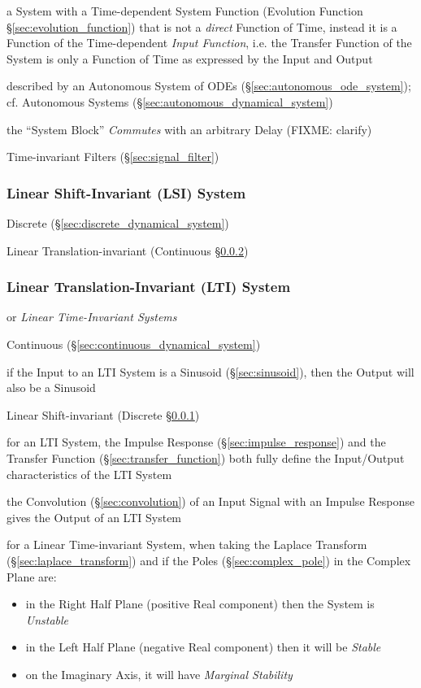 a System with a Time-dependent System Function (Evolution Function
\S\ref{sec:evolution_function}) that is not a \emph{direct} Function of Time,
instead it is a Function of the Time-dependent \emph{Input Function}, i.e. the
Transfer Function of the System is only a Function of Time as expressed by the
Input and Output

described by an Autonomous System of ODEs (\S\ref{sec:autonomous_ode_system});
cf. Autonomous Systems (\S\ref{sec:autonomous_dynamical_system})

the ``System Block'' \emph{Commutes} with an arbitrary Delay (FIXME: clarify)

\fist Time-invariant Filters (\S\ref{sec:signal_filter})



\subsubsection{Linear Shift-Invariant (LSI) System}\label{sec:lsi_system}

Discrete (\S\ref{sec:discrete_dynamical_system})

\fist Linear Translation-invariant (Continuous \S\ref{sec:lti_system})



\subsubsection{Linear Translation-Invariant (LTI) System}
\label{sec:lti_system}

or \emph{Linear Time-Invariant Systems}

Continuous (\S\ref{sec:continuous_dynamical_system})

if the Input to an LTI System is a Sinusoid (\S\ref{sec:sinusoid}), then the
Output will also be a Sinusoid

\fist Linear Shift-invariant (Discrete \S\ref{sec:lsi_system})

for an LTI System, the Impulse Response (\S\ref{sec:impulse_response}) and the
Transfer Function (\S\ref{sec:transfer_function}) both fully define the
Input/Output characteristics of the LTI System

the Convolution (\S\ref{sec:convolution}) of an Input Signal with an Impulse
Response gives the Output of an LTI System

for a Linear Time-invariant System, when taking the Laplace Transform
(\S\ref{sec:laplace_transform}) and if the Poles (\S\ref{sec:complex_pole}) in
the Complex Plane are:
\begin{itemize}
  \item in the Right Half Plane (positive Real component) then the System is
    \emph{Unstable}
  \item in the Left Half Plane (negative Real component) then it will be
    \emph{Stable}
  \item on the Imaginary Axis, it will have \emph{Marginal Stability}
\end{itemize}

